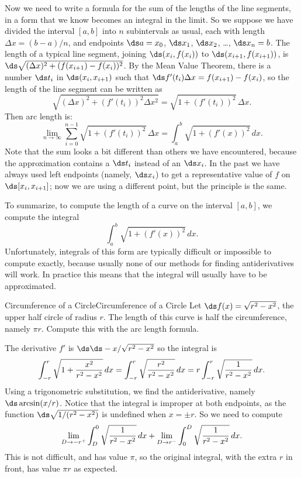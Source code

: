 Now we need to write a formula for the sum of the lengths of the line
segments, in a form that we know becomes an integral in the limit.  So
we suppose we have divided the interval $[a,b]$ into $n$ subintervals
as usual, each with length $\Delta x =(b-a)/n$, and endpoints $\ds
a=x_0$, $\ds x_1$, $\ds x_2$, \dots, $\ds x_n=b$.  The length of a
typical line segment, joining $\ds (x_i,f(x_i))$ to $\ds
(x_{i+1},f(x_{i+1}))$, is $\ds\sqrt{(\Delta x )^2
  +(f(x_{i+1})-f(x_i))^2}$.  By the Mean Value Theorem, %
there is a number $\ds t_i$ in $\ds (x_i,x_{i+1})$
such that $\ds f'(t_i)\Delta x=f(x_{i+1})-f(x_i)$, so the length of
the line segment can be written as
$$
  \sqrt{(\Delta x)^2 + (f'(t_i))^2\Delta x^2}=
  \sqrt{1+(f'(t_i))^2}\,\Delta x.
$$
Then arc length is:
$$
  \lim_{n\to\infty}\sum_{i=0}^{n-1} \sqrt{1+(f'(t_i))^2}\,\Delta x=
  \int_a^b \sqrt{1+(f'(x))^2}\,dx.
$$
Note that the sum looks a bit different than others we have
encountered, because the approximation contains a $\ds t_i$ instead of an
$\ds x_i$. In the past we have always used left endpoints (namely, $\ds x_i$)
to get a representative value of $f$ on $\ds [x_i,x_{i+1}]$; now we are
using a different point, but the principle is the same.

To summarize, to compute the length of a curve on the interval
$[a,b]$, we compute the integral
$$\int_a^b \sqrt{1+(f'(x))^2}\,dx.$$ 
Unfortunately, integrals of this form are typically difficult or
impossible to compute exactly, because usually none of our methods for
finding antiderivatives will work. In practice this means that the
integral will usually have to be approximated.

\begin{example}{Circumference of a Circle}{Circumference of a Circle}\label{Circumference of a Circle} 
Let $\ds f(x) = \sqrt{r^2-x^2}$, the upper half circle of radius
$r$. The length of this curve is half the circumference, namely $\pi
r$. Compute this with the arc length formula.
\end{example}

\begin{solution}
The derivative $f'$ is $\ds \ds -x/\sqrt{r^2-x^2}$ so the integral is
$$
  \int_{-r}^r \sqrt{1+{x^2\over r^2-x^2}}\,dx
  =\int_{-r}^r \sqrt{r^2\over r^2-x^2}\,dx
  =r\int_{-r}^r \sqrt{1\over r^2-x^2}\,dx.
$$
Using a trigonometric substitution, we find the antiderivative, namely
$\ds \arcsin(x/r)$. Notice that the integral is improper at both
endpoints, as the function $\ds \sqrt{1/(r^2-x^2)}$ is undefined when
$x=\pm r$. So we need to compute
$$
  \lim_{D\to-r^+}\int_D^0  \sqrt{1\over r^2-x^2}\,dx +
  \lim_{D\to r^-}\int_0^D  \sqrt{1\over r^2-x^2}\,dx.
$$
This is not difficult, and has value $\pi$, so the original integral,
with the extra $r$ in front, has value $\pi r$ as expected.
\end{solution}



